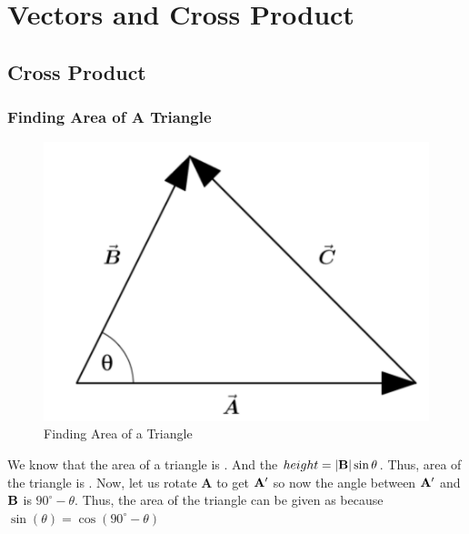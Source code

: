 

\chapter{Vectors and Cross Product}

\bigbreak
\section{Cross Product}

\subsection{Finding Area of A Triangle}

\begin{figure}[ht!]
	\centering
	\includegraphics[scale=0.5]{./images/lecture_2_figure_1.png}
	\caption{Finding Area of a Triangle}
\end{figure}

We know that the area of a triangle is .
And the $height = |{\bf B}| \sin \theta$.
Thus, area of the triangle is .
Now, let us rotate {\bf A} to get ${\bf A'}$ so now the angle between ${\bf A'}$ and ${\bf B}$ is $90^{\circ} - \theta$.
Thus, the area of the triangle can be given as  because $ \sin(\theta) = \cos(90^{\circ} - \theta) $

